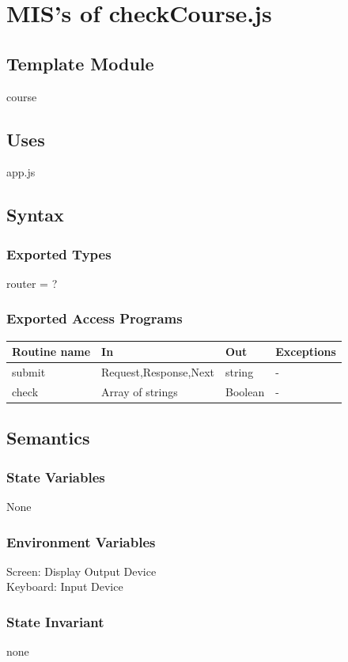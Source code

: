 \documentclass[11pt, oneside]{article}
\begin{document}
\newpage

\section{MIS's of checkCourse.js}
\subsection*{Template Module}
course
\subsection* {Uses}
app.js
\subsection* {Syntax}
\subsubsection* {Exported Types}
router = ?
\subsubsection* {Exported Access Programs}
\begin{tabular}{| l | l | l | l |}
\hline
\textbf{Routine name} & \textbf{In} & \textbf{Out} & \textbf{Exceptions}\\
\hline
submit & Request,Response,Next & string & -\\
\hline
check &  Array of strings & Boolean& -\\
\hline
\end{tabular}
\subsection* {Semantics}
\subsubsection* {State Variables}
None
\subsubsection*{Environment Variables}
Screen: Display Output Device \\
Keyboard: Input Device \\

\subsubsection* {State Invariant}
none
\end{document}
